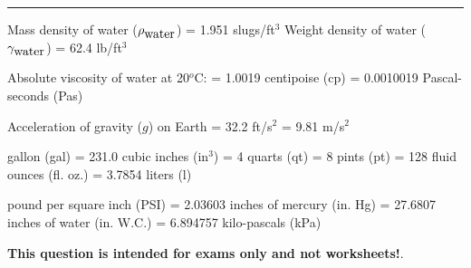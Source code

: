 \vskip 10pt
\hrule
\vskip 10pt

\noindent
Mass density of water ($\rho_{\hbox{water}}$) = 1.951 slugs/ft$^{3}$ \hskip 50pt Weight density of water ($\gamma_{\hbox{water}}$) = 62.4 lb/ft$^{3}$

\vskip 10pt

\noindent
Absolute viscosity of water at 20$^{o}$C: = 1.0019 centipoise (cp) = 0.0010019 Pascal-seconds (Pas)

\vskip 10pt

\noindent
Acceleration of gravity ($g$) on Earth = 32.2 ft/s$^{2}$ = 9.81 m/s$^{2}$

\vskip 10pt

 gallon (gal) = 231.0 cubic inches (in$^{3}$) = 4 quarts (qt) = 8 pints (pt) = 128 fluid ounces (fl. oz.) = 3.7854 liters (l)

\vskip 10pt

 pound per square inch (PSI) = 2.03603 inches of mercury (in. Hg) = 27.6807 inches of water (in. W.C.) = 6.894757 kilo-pascals (kPa) 














{\bf This question is intended for exams only and not worksheets!}.



